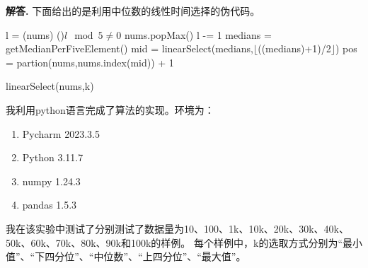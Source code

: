 \documentclass[12pt, a4paper, oneside]{article}
\newenvironment{solution}{\par\noindent\textbf{解答. }}{}
\begin{document}
\begin{solution}
下面给出的是利用中位数的线性时间选择的伪代码。

\begin{algorithm}
    l = \len(nums)\;
    \While(){$l \mod 5 \neq 0$}
    {
        nums.popMax()\;
        l -= 1\;
    }
    medians = getMedianPerFiveElement()\;
    mid = linearSelect(medians,$\lfloor$(\len(medians)+1)/2$\rfloor$)\;
    pos = partion(nums,nums.index(mid)) + 1\;
    \caption{linearSelect(nums,k)}
\end{algorithm}

我利用python语言完成了算法的实现。环境为：
\begin{enumerate}
    \item Pycharm 2023.3.5
    \item Python 3.11.7
    \item numpy 1.24.3
    \item pandas 1.5.3
\end{enumerate}

我在该实验中测试了分别测试了数据量为10、100、1k、10k、20k、30k、40k、50k、60k、70k、80k、90k和100k的样例。
每个样例中，k的选取方式分别为“最小值”、“下四分位”、“中位数”、“上四分位”、“最大值”。


\end{solution}
\end{document}
